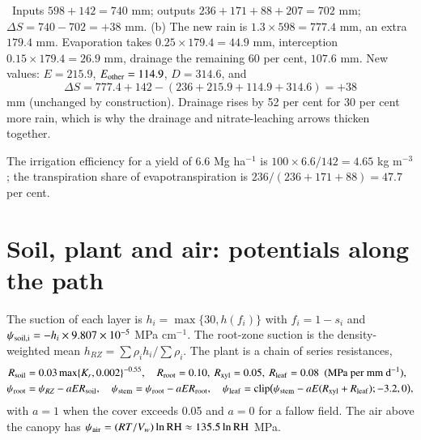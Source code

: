\sol {}\ Inputs $598+142=740$ mm; outputs $236+171+88+207=702$ mm; $\Delta S=740-702=+38$ mm. (b) The new rain is $1.3\times598=777.4$ mm, an extra $179.4$ mm. Evaporation takes $0.25\times179.4=44.9$ mm, interception $0.15\times179.4=26.9$ mm, drainage the remaining $60$ per cent, $107.6$ mm. New values: $E=215.9$, $E_{\rm other}=114.9$, $D=314.6$, and \[\Delta S=777.4+142-(236+215.9+114.9+314.6)=+38\] mm (unchanged by construction). Drainage rises by 52 per cent for 30 per cent more rain, which is why the drainage and nitrate-leaching arrows thicken together. \finans

 The irrigation efficiency for a yield of 6.6 Mg ha$^{-1}$ is $100\times6.6/142=4.65$ kg m$^{-3}$; the transpiration share of evapotranspiration is $236/(236+171+88)=47.7$ per cent.


\section{Soil, plant and air: potentials along the path}
The suction of each layer is $h_i=\max\{30,h(f_i)\}$ with $f_i=1-s_i$ and $\psi_{\rm soil,i}=-h_i\times9.807\times10^{-5}$ MPa cm$^{-1}$. The root-zone suction is the density-weighted mean $h_{RZ}=\sum\rho_ih_i/\sum\rho_i$. The plant is a chain of series resistances,
\begin{align}
R_{\rm soil}&=0.03\max\{K_r,0.002\}^{-0.55},\quad R_{\rm root}=0.10,\ R_{\rm xyl}=0.05,\ R_{\rm leaf}=0.08\ \ (\text{MPa per mm d}^{-1}),\\
\psi_{\rm root}&=\psi_{RZ}-aER_{\rm soil},\quad\psi_{\rm stem}=\psi_{\rm root}-aER_{\rm root},\quad\psi_{\rm leaf}=\mathrm{clip}\bigl(\psi_{\rm stem}-aE(R_{\rm xyl}+R_{\rm leaf});-3.2,0\bigr),
\end{align}
with $a=1$ when the cover exceeds 0.05 and $a=0$ for a fallow field. The air above the canopy has $\psi_{\rm air}=(RT/V_w)\ln\mathrm{RH}\approx135.5\ln\mathrm{RH}$ MPa.

